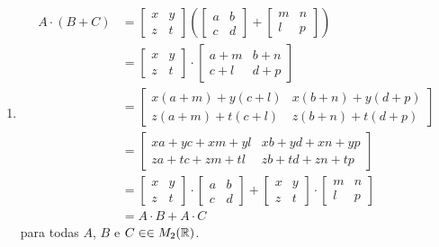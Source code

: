 \documentclass[12pt]{exam}
\begin{document}
\begin{enumerate}[label={\roman*})]
    \item
    \begin{align*}
        A\cdot(B + C) &= \begin{bmatrix}
        x & y\\z & t 
    \end{bmatrix}\left(\begin{bmatrix}
        a & b\\c & d 
    \end{bmatrix} + \begin{bmatrix}
        m & n\\
        l & p
    \end{bmatrix}\right)\\ &= \begin{bmatrix}
        x & y\\z & t 
    \end{bmatrix}\cdot \begin{bmatrix}
        a + m & b + n\\
        c + l & d + p
    \end{bmatrix}\\ &= \begin{bmatrix}
        x(a + m) + y(c + l) & x(b + n) + y(d + p)\\
        z(a + m) + t(c + l) & z(b + n) + t(d + p)
    \end{bmatrix}\\ &= \begin{bmatrix}
        xa + yc + xm + yl & xb + yd + xn + yp\\
        za + tc + zm + tl & zb + td + zn + tp
    \end{bmatrix}\\ &= \begin{bmatrix}
        x & y\\z & t 
    \end{bmatrix}\cdot \begin{bmatrix}
        a & b\\c & d 
    \end{bmatrix} + \begin{bmatrix}
        x & y\\z & t 
    \end{bmatrix}\cdot \begin{bmatrix}
        m & n\\
        l & p
    \end{bmatrix}\\ &= A\cdot B + A \cdot C
    \end{align*}
    para todas $A$, $B$ e $C \in \in M_2(\mathbb{R})$.
\end{enumerate}
\end{document}
